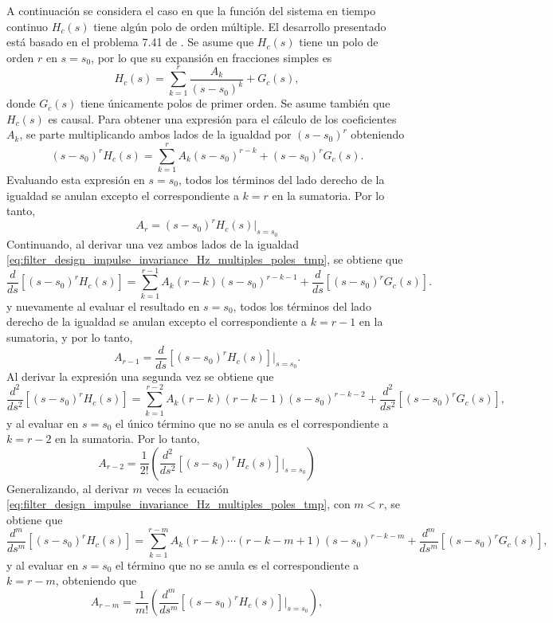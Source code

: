 \documentclass[a4paper]{report}
\begin{document}
A continuación se considera el caso en que la función del sistema en tiempo continuo \(H_c(s)\) tiene algún polo de orden múltiple. El desarrollo presentado está basado en el problema 7.41 de \cite{oppenheim2009discrete}. Se asume que \(H_c(s)\) tiene un polo de orden \(r\) en \(s=s_0\), por lo que su expansión en fracciones simples es 
\begin{equation}\label{eq:filter_design_impulse_invariance_Hz_multiples_poles}
 H_c(s)=\sum_{k=1}^r\frac{A_k}{(s-s_0)^k}+G_c(s), 
\end{equation}
donde \(G_c(s)\) tiene únicamente polos de primer orden. Se asume también que \(H_c(s)\) es causal. Para obtener una expresión para el cálculo de los coeficientes \(A_k\), se parte multiplicando ambos lados de la igualdad por \((s-s_0)^r\) obteniendo
\begin{equation}\label{eq:filter_design_impulse_invariance_Hz_multiples_poles_tmp}
 (s-s_0)^rH_c(s)=\sum_{k=1}^rA_k(s-s_0)^{r-k}+(s-s_0)^rG_c(s).  
\end{equation}
Evaluando esta expresión en \(s=s_0\), todos los términos del lado derecho de la igualdad se anulan excepto el correspondiente a \(k=r\) en la sumatoria. Por lo tanto,
\[
 A_r=(s-s_0)^rH_c(s)\big|_{s=s_0}
\]
Continuando, al derivar una vez ambos lados de la igualdad \ref{eq:filter_design_impulse_invariance_Hz_multiples_poles_tmp}, se obtiene que
\[
  \frac{d}{ds}[(s-s_0)^rH_c(s)]=\sum_{k=1}^{r-1}A_k(r-k)(s-s_0)^{r-k-1}+\frac{d}{ds}[(s-s_0)^rG_c(s)].  
\]
y nuevamente al evaluar el resultado en \(s=s_0\), todos los términos del lado derecho de la igualdad se anulan excepto el correspondiente a \(k=r-1\) en la sumatoria, y por lo tanto,
\[
 A_{r-1}=\frac{d}{ds}[(s-s_0)^rH_c(s)]\bigg|_{s=s_0}.
\]
Al derivar la expresión una segunda vez se obtiene que
\[
  \frac{d^2}{ds^2}[(s-s_0)^rH_c(s)]=\sum_{k=1}^{r-2}A_k(r-k)(r-k-1)(s-s_0)^{r-k-2}+\frac{d^2}{ds^2}[(s-s_0)^rG_c(s)], 
\]
y al evaluar en \(s=s_0\) el único término que no se anula es el correspondiente a \(k=r-2\) en la sumatoria. Por lo tanto,
\[
 A_{r-2}=\frac{1}{2!}\left(\frac{d^2}{ds^2}[(s-s_0)^rH_c(s)]\bigg|_{s=s_0}\right)
\]
Generalizando, al derivar \(m\) veces la ecuación \ref{eq:filter_design_impulse_invariance_Hz_multiples_poles_tmp}, con \(m<r\), se obtiene que 
\[
  \frac{d^m}{ds^m}[(s-s_0)^rH_c(s)]=\sum_{k=1}^{r-m}A_k(r-k)\cdots(r-k-m+1)(s-s_0)^{r-k-m}+\frac{d^m}{ds^m}[(s-s_0)^rG_c(s)], 
\]
y al evaluar en \(s=s_0\) el término que no se anula es el correspondiente a \(k=r-m\), obteniendo que 
\[
 A_{r-m}=\frac{1}{m!}\left(\frac{d^m}{ds^m}[(s-s_0)^rH_c(s)]\bigg|_{s=s_0}\right),
\]
\end{document}
